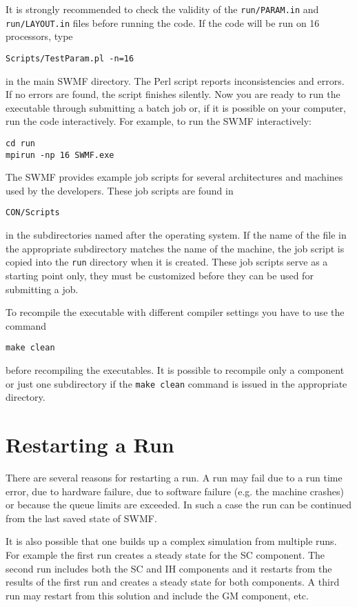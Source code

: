 It is strongly recommended to check the validity of the {\tt run/PARAM.in} and 
{\tt run/LAYOUT.in} files before running the code. If the
code will be run on 16 processors, type
\begin{verbatim}
Scripts/TestParam.pl -n=16
\end{verbatim}
in the main SWMF directory.
The Perl script reports inconsistencies and errors. 
If no errors are found, the script finishes silently.
Now you are ready to run the executable through submitting a batch job or, 
if it is possible on your computer, run the code interactively.  For
example, to run the SWMF interactively:
\begin{verbatim}
cd run
mpirun -np 16 SWMF.exe
\end{verbatim}
The SWMF provides example job scripts for several architectures and
machines used by the developers. These job scripts are found in 
\begin{verbatim}
CON/Scripts
\end{verbatim}
in the subdirectories named after the operating system. If the name
of the file in the appropriate subdirectory matches the 
name of the machine, the job script is copied into
the {\tt run} directory when it is created.
These job scripts serve as a starting point only, they must
be customized before they can be used for submitting a job.

To recompile the executable with different compiler settings you have
to use the command
\begin{verbatim}
make clean
\end{verbatim}
before recompiling the executables. It is possible to recompile
only a component or just one subdirectory if the {\tt make clean}
command is issued in the appropriate directory.

\section{Restarting a Run}

There are several reasons for restarting a run. A run may fail
due to a run time error, due to hardware failure, due to 
software failure (e.g. the machine crashes) or because the
queue limits are exceeded. In such a case the run can be continued from
the last saved state of SWMF. 

It is also possible that one builds up a complex simulation from multiple 
runs. For example the first run creates a steady state for the SC component.
The second run includes both the SC and IH components and it 
restarts from the results of the first run and creates a steady state
for both components. A third run may restart from this solution and include
the GM component, etc. 

